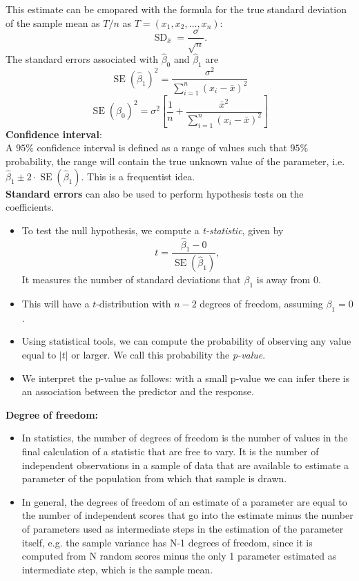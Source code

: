 \documentclass[11pt, a4paper]{article}
\begin{document}
This estimate can be cmopared with the formula for the true standard deviation of the sample mean as $T/n$ as $T=(x_1,x_2,\dots,x_n)$:
\[
  \operatorname{SD}_{\bar{x}}=\frac{\sigma}{\sqrt{n}}.
\]
The standard errors associated with $\hat{\beta}_0$ and $\hat{\beta}_1$ are
\[
  \operatorname{SE}(\hat{\beta}_1)^2=\frac{\sigma^2}{\sum_{i=1}^n(x_i-\bar{x})^2}
\]
\[
  \operatorname{SE}(\hat{\beta}_0)^2 =\sigma^2[\frac{1}{n}+\frac{\bar{x}^2}{\sum_{i=1}^n(x_i-\bar{x})^2}]
\]
\textbf{Confidence interval}:\\
A $95\%$ confidence interval is defined as a range of values such that $95\%$ probability, the range will contain the true unknown value of the parameter, i.e. $\hat{\beta}_1\pm 2\cdot \operatorname{SE}(\hat{\beta}_1)$. This is a frequentist idea.\\[1mm]
\textbf{Standard errors} can also be used to perform hypothesis tests on the coefficients. 
\begin{itemize}
\item To test the null hypothesis, we compute a \emph{t-statistic}, given by
\[
  t=\frac{\hat{\beta}_1-0}{\operatorname{SE}(\hat{\beta}_1)},
\]
It measures the number of standard deviations that $\beta_1$ is away from 0.
\item This will have a $t$-distribution with $n-2$ degrees of freedom, assuming $\beta_1=0$.
\item Using statistical tools, we can compute the probability of observing any value equal to $|t|$ or larger. We call this probability the \emph{p-value}.
\item We interpret the p-value as follows: with a small p-value 
we can infer there is an association between the predictor and the response.
\end{itemize}
\textbf{Degree of freedom:} 
\begin{itemize}
\item In statistics, the number of degrees of freedom is the number of values in the final calculation of a statistic that are free to vary. It is the number of independent observations in a sample of data that are available to estimate a parameter of the population from which that sample is drawn. 
\item In general, the degrees of freedom of an estimate of a parameter are equal to the number of independent scores that go into the estimate minus the number of parameters used as intermediate steps in the estimation of the parameter itself, e.g.  the sample variance has N-1 degrees of freedom, since it is computed from N random scores minus the only 1 parameter estimated as intermediate step, which is the sample mean.
\end{itemize}
\end{document}
